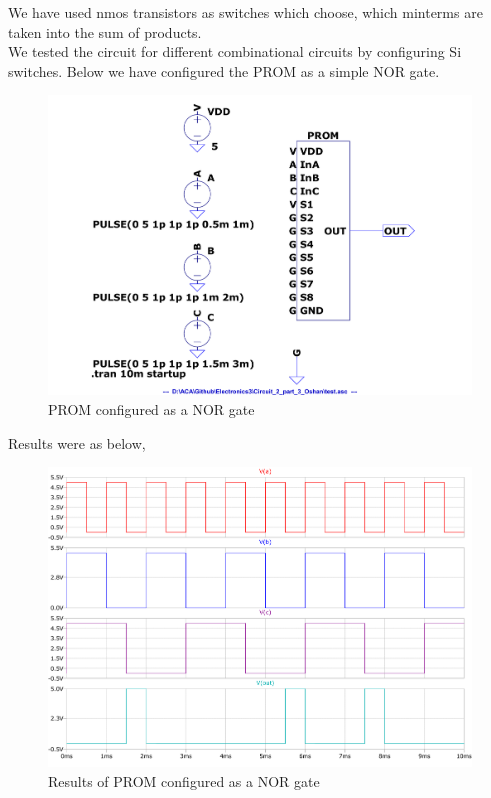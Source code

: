 \documentclass[a4paper,11pt]{article}%
\begin{document}
We have used nmos transistors as switches which choose, which minterms are taken into the sum of products.\\

We tested the circuit for different combinational circuits by configuring Si switches. Below we have configured the PROM as a simple NOR gate.\\


\begin{figure}[H]
	\centering
	\includegraphics[scale=0.4]{figures/Figure335.pdf}
	\caption{PROM configured as a NOR gate}
\end{figure}

Results were as below,
\begin{figure}[H]
	\centering
	\includegraphics[scale=0.5]{figures/Figure336.pdf}
	\caption{Results of PROM configured as a NOR gate}
\end{figure}
\end{document}

